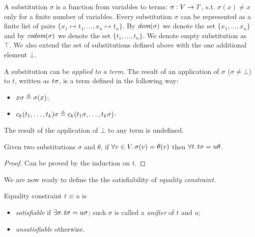 \begin{definition}
  A substitution $\sigma$ is a function 
  from variables to terms:
  $\sigma : V \rightarrow T$,
  s.t. $\sigma(x) \neq x$ only for a finite number of variables.
  Every substitution $\sigma$ can be represented as 
  a finite list of pairs $\{x_1 \mapsto t_1, \dots, x_n \mapsto t_n \}$. 
  By $\textit{dom}{({\sigma})}$ we denote the set $\{x_1, \dots, x_n\}$
  and by $\textit{codom}{({\sigma})}$ we denote the set $\{t_1, \dots, t_n\}$.
  We denote empty substitution as $\top$.
  We also extend the set of substitutions defined above
  with the one additional element $\bot$.
\end{definition}

\begin{definition}
  A substitution can be \emph{applied to a term}.
  The result of an application of $\sigma$ ($\sigma \neq \bot$) to $t$,
  written as ${t}{\sigma}$, is a term defined 
  in the following way:
  \begin{itemize}
    \item ${x}{\sigma} \triangleq \sigma(x)$;
    \item ${c_k(t_1, \dots, t_k)}{\sigma} \triangleq c_k({t_1}{\sigma}, \dots, {t_k}{\sigma})$.
  \end{itemize}
  The result of the application of $\bot$ to any term is undefined.
\end{definition}

\begin{lemma}
  \label{lemma:app}
  Given two substitutions $\sigma$ and $\theta$,
  if $\forall v \in V\ldotp \sigma(v) = \theta(v)$ 
  then $\forall t\ldotp {t}{\sigma} = {u}{\theta}$.
\end{lemma}

\begin{proof}
  Can be proved by the induction on $t$.
\end{proof}

We are now ready to define the  
the satisfiability of \emph{equality constraint}.

\begin{definition}
  \label{def:eq-ctr}
  Equality constraint $t \equiv u$ is 
  \begin{itemize}
    \item \emph{satisfiable} if $\exists \sigma\ldotp {t}{\sigma} = {u}{\sigma}$;
          such $\sigma$ is called a \emph{unifier} of $t$ and $u$;
    \item \emph{unsatisfiable} otherwise.
  \end{itemize}
\end{definition}

